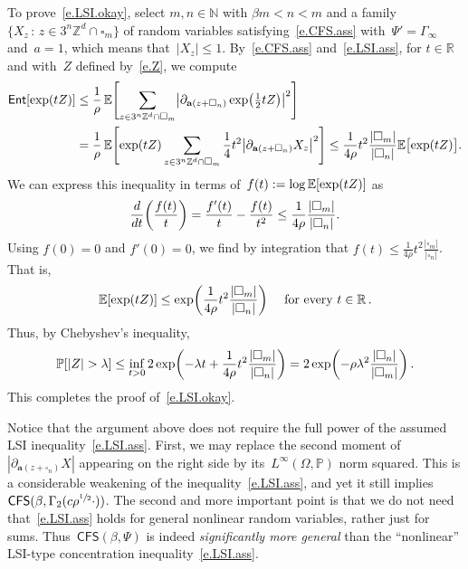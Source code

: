 \documentclass[11pt]{article} %
\let\oldsquare\square %
\renewcommand{\square}{\oldsquare}
\numberwithin{equation}{section}
\theoremstyle{definition}
\let\originalleft\left
\let\originalright\right
\renewcommand{\left}{\mathopen{}\mathclose\bgroup\originalleft}
\renewcommand{\right}{\aftergroup\egroup\originalright}
\newcommand*{\N}{\ensuremath{\mathbb{N}}}
\newcommand*{\R}{\ensuremath{\mathbb{R}}}
\newcommand*{\Zd}{\ensuremath{\mathbb{Z}^d}}
\renewcommand{\a}{\mathbf{a}}
\newcommand{\cu}{\square}
\renewcommand{\P}{\mathbb{P}}
\newcommand{\E}{\mathbb{E}}
\newcommand{\Ent}{\mathsf{Ent}}
\newcommand{\CFS}{\mathsf{CFS}}
\begin{document}
\smallskip

To prove~\eqref{e.LSI.okay}, select $m,n\in\N$ with $\beta m<n<m$ and a family $\{ X_z \,:\, z\in 3^n\Zd\cap \cu_m\}$ of random variables satisfying~\eqref{e.CFS.ass} with~$\Psi' = \Gamma_\infty$ and~$a=1$, which means that~$|X_z| \leq 1$. By~\eqref{e.CFS.ass} and~\eqref{e.LSI.ass}, for $t\in\R$ and with~$Z$ defined by~\eqref{e.Z},
we compute
\begin{align*}
\Ent\left[  \exp (tZ)  \right]
& 
\leq 
\frac1\rho\,
\E \Biggl[
\sum_{z\in 3^n\Zd \cap \cu_m}
\bigl| \partial_{\a(z+\cu_n)} \exp\left( \tfrac12tZ \right)
\bigr|^2
\Biggr]
\\ & 
=
\frac1\rho\,
\E \Biggl[  \exp\left( tZ \right) 
\sum_{z\in 3^n\Zd \cap \cu_m}
\frac1{4}t^2 
\bigl| \partial_{\a(z+\cu_n)} X_z \bigr|^2
\Biggr]
\leq 
\frac1{4\rho}t^2 \frac{|\cu_m|}{|\cu_n|}
\E \bigl[  \exp\left( tZ \right) \bigr].
\end{align*}
We can express this inequality in terms of~$f(t):= \log \E \left[  \exp\left( t Z  \right) \right]$ as
\begin{equation*} \label{}
\frac{d}{dt} \left(\frac{f(t)}{t} \right) 
= 
\frac{f'(t)}{t} - \frac{f(t)}{t^2} 
\leq 
\frac1{4\rho} \frac{|\cu_m|}{|\cu_n|}.
\end{equation*}
Using $f(0) = 0$ and $f'(0) = 0$, we find by integration that $f(t) \leq \frac1{4\rho}t^2 \frac{|\cu_m|}{|\cu_n|}$. That is, 
\begin{equation*}
\E \left[  \exp \left( t Z \right) \right]
\leq 
\exp\left( \frac1{4\rho} t^2 \frac{|\cu_m|}{|\cu_n|} \right) 
\quad 
\mbox{ for every $t \in \R$}\,.
\end{equation*}
Thus, by Chebyshev's inequality, 
\begin{equation}
\P \left[ |Z| > \lambda \right] 
\leq 
\inf_{t>0} 
2 \exp\left( -\lambda t + \frac1{4 \rho} t^2 \frac{|\cu_m|}{|\cu_n|} \right)
=
2\exp \left( - \rho \lambda^2 \frac{|\cu_n|}{|\cu_m|} \right)
\,.
\end{equation}
This completes the proof of~\eqref{e.LSI.okay}. 


\smallskip

Notice that the argument above does not require the full power of the assumed LSI inequality~\eqref{e.LSI.ass}. First, we may replace the second moment of~$|\partial_{\a(z+\cu_n)} X|$ appearing on the right side by its~$L^\infty(\Omega,\P)$ norm squared. This is a considerable weakening of the inequality~\eqref{e.LSI.ass}, and yet it still implies~$\CFS(\beta,\Gamma_2(c\rho^{\sfrac12}\cdot))$. The second and more important point is that we do not need that~\eqref{e.LSI.ass} holds for general nonlinear random variables, rather just for sums. Thus~$\CFS(\beta,\Psi)$ is indeed \emph{significantly more general} than the ``nonlinear'' LSI-type concentration inequality~\eqref{e.LSI.ass}.
\end{document}
